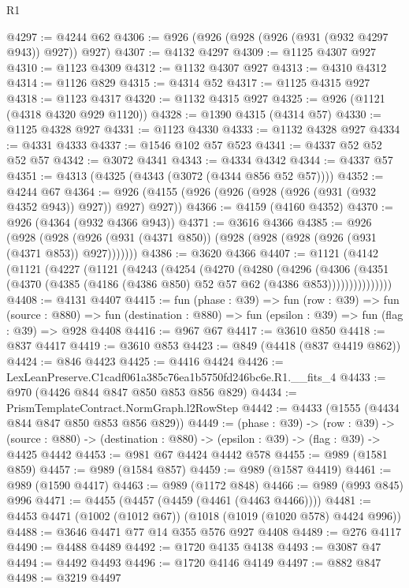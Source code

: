 \begin{lexlean}{R1}
\begin{coremodule}
@4297 := @4244 @62
@4306 := @926 (@926 (@928 (@926 (@931 (@932 @4297 @943)) @927)) @927)
@4307 := @4132 @4297
@4309 := @1125 @4307 @927
@4310 := @1123 @4309
@4312 := @1132 @4307 @927
@4313 := @4310 @4312
@4314 := @1126 @829
@4315 := @4314 @52
@4317 := @1125 @4315 @927
@4318 := @1123 @4317
@4320 := @1132 @4315 @927
@4325 := @926 (@1121 (@4318 @4320 @929 @1120))
@4328 := @1390 @4315 (@4314 @57)
@4330 := @1125 @4328 @927
@4331 := @1123 @4330
@4333 := @1132 @4328 @927
@4334 := @4331 @4333
@4337 := @1546 @102 @57 @523
@4341 := @4337 @52 @52 @52 @57
@4342 := @3072 @4341
@4343 := @4334 @4342
@4344 := @4337 @57
@4351 := @4313 (@4325 (@4343 (@3072 (@4344 @856 @52 @57))))
@4352 := @4244 @67
@4364 := @926 (@4155 (@926 (@926 (@928 (@926 (@931 (@932 @4352 @943)) @927)) @927) @927))
@4366 := @4159 (@4160 @4352)
@4370 := @926 (@4364 (@932 @4366 @943))
@4371 := @3616 @4366
@4385 := @926
    (@928 (@928 (@926 (@931 (@4371 @850)) (@928 (@928 (@928 (@926 (@931 (@4371 @853)) @927)))))))
@4386 := @3620 @4366
@4407 := @1121
    (@4142
      (@1121
        (@4227
          (@1121
            (@4243
              (@4254
                (@4270
                  (@4280
                    (@4296
                      (@4306
                        (@4351
                          (@4370 (@4385 (@4186 (@4386 @850) @52 @57 @62 (@4386 @853)))))))))))))))
@4408 := @4131 @4407
@4415 := fun (phase : @39) =>
  fun (row : @39) =>
  fun (source : @880) =>
  fun (destination : @880) => fun (epsilon : @39) => fun (flag : @39) => @928 @4408
@4416 := @967 @67
@4417 := @3610 @850
@4418 := @837 @4417
@4419 := @3610 @853
@4423 := @849 (@4418 (@837 @4419 @862))
@4424 := @846 @4423
@4425 := @4416 @4424
@4426 := LexLeanPreserve.C1cadf061a385c76ea1b5750fd246bc6e.R1.__fits_4
@4433 := @970 (@4426 @844 @847 @850 @853 @856 @829)
@4434 := PrismTemplateContract.NormGraph.l2RowStep
@4442 := @4433 (@1555 (@4434 @844 @847 @850 @853 @856 @829))
@4449 := (phase : @39) ->
  (row : @39) ->
  (source : @880) -> (destination : @880) -> (epsilon : @39) -> (flag : @39) -> @4425 @4442
@4453 := @981 @67 @4424 @4442 @578
@4455 := @989 (@1581 @859)
@4457 := @989 (@1584 @857)
@4459 := @989 (@1587 @4419)
@4461 := @989 (@1590 @4417)
@4463 := @989 (@1172 @848)
@4466 := @989 (@993 @845) @996
@4471 := @4455 (@4457 (@4459 (@4461 (@4463 @4466))))
@4481 := @4453 @4471 (@1002 (@1012 @67)) (@1018 (@1019 (@1020 @578) @4424 @996))
@4488 := @3646 @4471 @77 @14 @355 @576 @927 @4408
@4489 := @276 @4117
@4490 := @4488 @4489
@4492 := @1720 @4135 @4138
@4493 := @3087 @47
@4494 := @4492 @4493
@4496 := @1720 @4146 @4149
@4497 := @882 @847
@4498 := @3219 @4497

\end{coremodule}
\end{lexlean}
